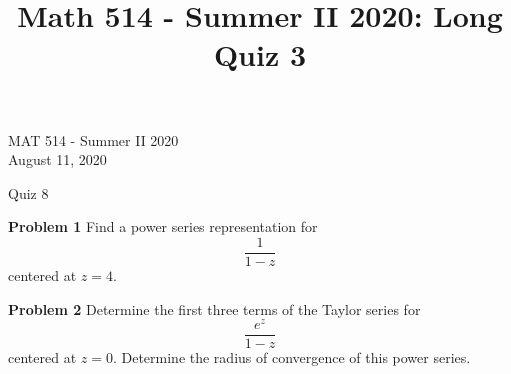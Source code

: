 \documentclass[12pt,oneside]{exam}
\title{Math 514 - Summer II 2020: Long Quiz 3}
\newenvironment{exercise}[1]{\vspace{.1in}\noindent\textbf{Problem #1 \hspace{.05em}}}{}
\begin{document}
\begin{flushright}
\sc MAT 514 - Summer II 2020\\
August 11, 2020
\end{flushright}
\bigskip
 
\begin{center}
\textsf{Quiz 8} 
\end{center}

\begin{exercise}{1}
Find a power series representation for 
\begin{equation*}
\frac{1}{1-z}
\end{equation*}
centered at $z=4$. 
\end{exercise}

\vfill

\begin{exercise}{2}
Determine the first three terms of the Taylor series for 
\begin{equation*}
\frac{e^z}{1-z}
\end{equation*}
centered at $z=0$. Determine the radius of convergence of this power series. 
\end{exercise}

\vfill
\end{document}
